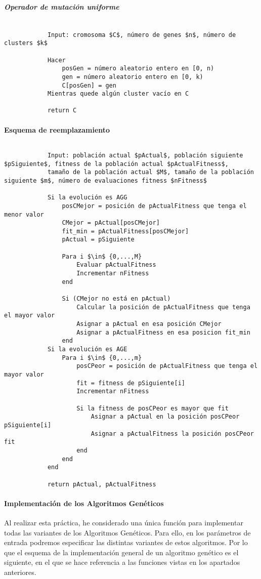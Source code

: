 		\subparagraph{Operador de mutación uniforme}
		$ $\\
		\footnotesize 
		\begin{lstlisting}
			Input: cromosoma $C$, número de genes $n$, número de clusters $k$

			Hacer
				posGen = número aleatorio entero en [0, n)
				gen = número aleatorio entero en [0, k)
				C[posGen] = gen
			Mientras quede algún cluster vacío en C

			return C	
		\end{lstlisting}
		\normalsize

		\paragraph{Esquema de reemplazamiento}
		$ $\\

		\footnotesize 
		\begin{lstlisting}
			Input: población actual $pActual$, población siguiente $pSiguiente$, fitness de la población actual $pActualFitness$, 
			tamaño de la población actual $M$, tamaño de la población siguiente $m$, número de evaluaciones fitness $nFitness$
			
			Si la evolución es AGG
				posCMejor = posición de pActualFitness que tenga el menor valor 
				CMejor = pActual[posCMejor]
				fit_min = pActualFitness[posCMejor]
				pActual = pSiguiente 

				Para i $\in$ {0,...,M}
					Evaluar pActualFitness
					Incrementar nFitness
				end 

				Si (CMejor no está en pActual)
					Calcular la posición de pActualFitness que tenga el mayor valor 
					Asignar a pActual en esa posición CMejor 
					Asignar a pActualFitness en esa posicion fit_min
				end
			Si la evolución es AGE 
				Para i $\in$ {0,...,m}
					posCPeor = posición de pActualFitness que tenga el mayor valor
					fit = fitness de pSiguiente[i]
					Incrementar nFitness 

					Si la fitness de posCPeor es mayor que fit
						Asignar a pActual en la posición posCPeor pSiguiente[i] 
						Asignar a pActualFitness la posición posCPeor fit 
					end 
				end 
			end 

			return pActual, pActualFitness
		\end{lstlisting}
		\normalsize

		\paragraph{Implementación de los Algoritmos Genéticos}
		$ $\\
		Al realizar esta práctica, he considerado una única función para implementar todas las variantes de los Algoritmos Genéticos.
		Para ello, en los parámetros de entrada podremos especificar las distintas variantes de estos algoritmos.
		Por lo que el esquema de la implementación general de un algoritmo genético es el siguiente, en el que se hace referencia a las funciones vistas en los apartados anteriores.
		
